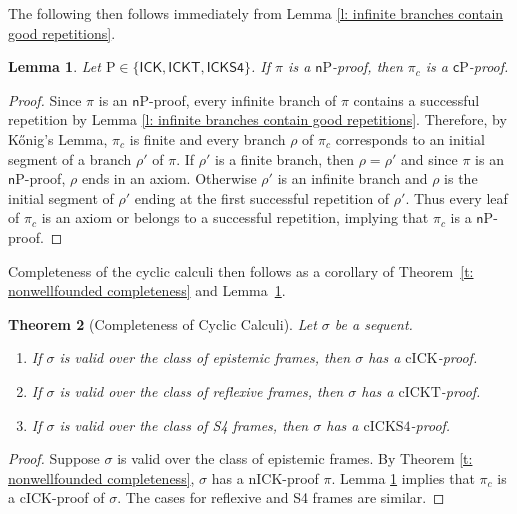 \documentclass{myifcolog}
\newcommand{\hickp}{\mathrm{P}}
\newcommand{\cick}{\mathrm{cICK}}
\newcommand{\cickt}{\mathrm{cICKT}}
\newcommand{\cicks}{\mathrm{cICKS4}}
\newcommand{\nick}{\mathrm{nICK}}
\newtheorem{theorem}{Theorem}
\newtheorem{lemma}[theorem]{Lemma}
\numberwithin{theorem}{section}
\begin{document}
The following then follows immediately from Lemma \ref{l: infinite branches contain good repetitions}.

\begin{lemma}\label{l: non-wellfounded proof implies cyclic proof}
   Let $\hickp \in \{\mathsf{ICK}, \mathsf{ICKT}, \mathsf{ICKS4}\}$. If $\pi$ is a $\mathsf{n}\hickp$-proof, then $\pi_c$ is a $\mathsf{c}\hickp$-proof.
\end{lemma}
\begin{proof}
    Since $\pi$ is an $\mathsf{n}\hickp$-proof, every infinite branch of $\pi$ contains a successful repetition by Lemma \ref{l: infinite branches contain good repetitions}. Therefore, by K\H{o}nig's Lemma, $\pi_c$ is finite and every branch $\rho$ of $\pi_c$ corresponds to an initial segment of a branch $\rho'$ of $\pi$. If $\rho'$ is a finite branch, then $\rho = \rho'$ and since $\pi$ is an $\mathsf{n}\hickp$-proof, $\rho$ ends in an axiom. Otherwise $\rho'$ is an infinite branch and $\rho$ is the initial segment of $\rho'$ ending at the first successful repetition of $\rho'$. Thus every leaf of $\pi_c$ is an axiom or belongs to a successful repetition, implying that $\pi_c$ is a $\mathsf{n}\hickp$-proof.
\end{proof}

Completeness of the cyclic calculi then follows as a corollary of Theorem~\ref{t: nonwellfounded completeness} and Lemma~\ref{l: non-wellfounded proof implies cyclic proof}.

\begin{theorem}[Completeness of Cyclic Calculi]\label{t: cyclic completeness}
   Let $\sigma$ be a sequent.
   \begin{enumerate}
       \item If $\sigma$ is valid over the class of epistemic frames, then $\sigma$ has a $\cick$-proof.
        \item If $\sigma$ is valid over the class of reflexive frames, then $\sigma$ has a $\cickt$-proof.
         \item If $\sigma$ is valid over the class of S4 frames, then $\sigma$ has a $\cicks$-proof.
   \end{enumerate}
\end{theorem}
\begin{proof}
     Suppose $\sigma$ is valid over the class of epistemic frames. By Theorem \ref{t: nonwellfounded completeness}, $\sigma$ has a $\nick$-proof $\pi$. Lemma \ref{l: non-wellfounded proof implies cyclic proof} implies that $\pi_c$ is a $\cick$-proof of $\sigma$. The cases for reflexive and S4 frames are similar.
\end{proof}
\end{document}

